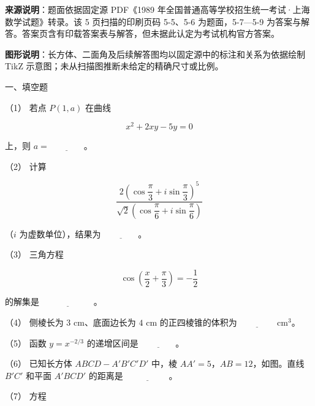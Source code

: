 


\begin{gktip}
\textbf{来源说明}：题面依据固定源 PDF《1989 年全国普通高等学校招生统一考试·上海数学试题》转录。该 5 页扫描的印刷页码 5-5、5-6 为题面，5-7—5-9 为答案与解答。答案页含有印载答案表与解答，但未据此认定为考试机构官方答案。

\textbf{图形说明}：长方体、二面角及后续解答图均以固定源中的标注和关系为依据绘制 TikZ 示意图；未从扫描图推断未给定的精确尺寸或比例。
\end{gktip}

\Needspace{0.4\textheight}
\begin{question}

一、填空题

（1） 若点 $P(1,a)$ 在曲线

\nopagebreak[4]
\[
x^2+2xy-5y=0
\]

上，则 $a=\underline{\hspace{4em}}$。

（2） 计算

\nopagebreak[4]
\[
\frac{2\left(\cos\dfrac\pi3+i\sin\dfrac\pi3\right)^5}
{\sqrt2\left(\cos\dfrac\pi6+i\sin\dfrac\pi6\right)}
\]

（$i$ 为虚数单位），结果为 $\underline{\hspace{4em}}$。

（3） 三角方程

\nopagebreak[4]
\[
\cos\left(\frac{x}{2}+\frac\pi3\right)=-\frac12
\]

的解集是 $\underline{\hspace{6em}}$。

（4） 侧棱长为 $3\text{ cm}$、底面边长为 $4\text{ cm}$ 的正四棱锥的体积为 $\underline{\hspace{4em}}\text{ cm}^3$。

（5） 函数 $y=x^{-2/3}$ 的递增区间是 $\underline{\hspace{4em}}$。

（6） 已知长方体 $ABCD-A'B'C'D'$ 中，棱 $AA'=5$，$AB=12$，如图。直线 $B'C'$ 和平面 $A'BCD'$ 的距离是 $\underline{\hspace{5em}}$。
\nopagebreak[4]
\begin{center}\end{center}
\nopagebreak[4]
（7） 方程


\end{question}
